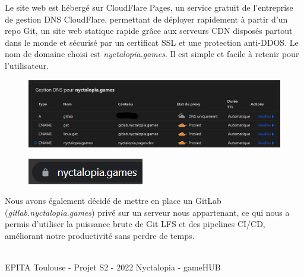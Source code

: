 Le site web est hébergé sur CloudFlare Pages, un service gratuit de l'entreprise de gestion DNS CloudFlare, permettant de déployer rapidement à partir d'un repo Git, un site web statique rapide grâce aux serveurs CDN disposés partout dans le monde et sécurisé par un certificat SSL et une protection anti-DDOS.
Le nom de domaine choisi est \emph{nyctalopia.games}. Il est simple et facile à retenir pour l'utilisateur.

\begin{figure}[H]
\centering
\begin{minipage}{.5\textwidth}
  \centering
  \centerline{\includegraphics[width=2\linewidth]{img/ui/dns.png}}
  \label{fig:dns}
\end{minipage}%
\end{figure}

\begin{figure}[H]
\centering
\begin{minipage}{.5\textwidth}
  \centering
  \centerline{\includegraphics[width=1.5\linewidth]{img/ssl.png}}
  \label{fig:ssl}
\end{minipage}%
\end{figure}

Nous avons également décidé de mettre en place un GitLab (\emph{gitlab.nyctalopia.games}) privé sur un serveur nous appartenant, ce qui nous a permis d'utiliser la puissance brute de Git LFS et des pipelines CI/CD, améliorant notre productivité sans perdre de temps.

\vfill
\noindent\makebox[\linewidth]{\rule{.8\paperwidth}{.6pt}}\\[0.2cm]
EPITA Toulouse - Projet S2 - 2022 \hfill Nyctalopia - gameHUB
\noindent\makebox[\linewidth]{\rule{.8\paperwidth}{.6pt}}

\newpage